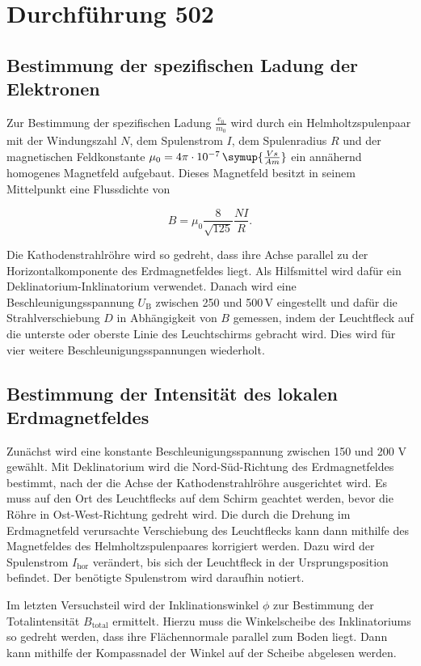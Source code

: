 \section{Durchführung 502}

\subsection{Bestimmung der spezifischen Ladung der Elektronen}

Zur Bestimmung der spezifischen Ladung $\frac{e_0}{m_0}$ wird durch ein Helmholtzspulenpaar mit der Windungszahl $N$, dem Spulenstrom $I$, dem Spulenradius $R$ und der magnetischen Feldkonstante 
$\mu_0 = 4\pi \cdot 10^{-7}\,\symup{\frac{V s}{A m}}$ ein annähernd homogenes Magnetfeld aufgebaut. Dieses Magnetfeld besitzt in seinem Mittelpunkt eine Flussdichte von

\begin{equation}
B = \mu_0 \frac{8}{\sqrt{125}} \frac{N I}{R}.
\end{equation}

Die Kathodenstrahlröhre wird so gedreht, dass ihre Achse parallel zu der Horizontalkomponente des Erdmagnetfeldes liegt. Als Hilfsmittel wird dafür ein Deklinatorium-Inklinatorium verwendet. Danach wird eine
Beschleunigungsspannung $U_{\text{B}}$ zwischen 250 und 500\,V eingestellt und dafür die Strahlverschiebung $D$ in Abhängigkeit von $B$ gemessen, indem der Leuchtfleck auf die unterste oder oberste Linie 
des Leuchtschirms gebracht wird. Dies wird für vier weitere Beschleunigungsspannungen wiederholt.



\subsection{Bestimmung der Intensität des lokalen Erdmagnetfeldes}

Zunächst wird eine konstante Beschleunigungsspannung zwischen 150 und 200 V gewählt. Mit Deklinatorium wird die Nord-Süd-Richtung des Erdmagnetfeldes bestimmt, nach der die Achse der Kathodenstrahlröhre 
ausgerichtet wird. Es muss auf den Ort des Leuchtflecks auf dem Schirm geachtet werden, bevor die Röhre in Ost-West-Richtung gedreht wird. Die durch die Drehung im Erdmagnetfeld verursachte Verschiebung des 
Leuchtflecks kann dann mithilfe des Magnetfeldes des Helmholtzspulenpaares korrigiert werden. Dazu wird der Spulenstrom $I_{\text{hor}}$ verändert, bis sich der Leuchtfleck in der Ursprungsposition befindet. 
Der benötigte Spulenstrom wird daraufhin notiert.

Im letzten Versuchsteil wird der Inklinationswinkel $\phi$ zur Bestimmung der Totalintensität $B_{\text{total}}$ ermittelt. Hierzu muss die Winkelscheibe des Inklinatoriums so gedreht werden, dass ihre Flächennormale
parallel zum Boden liegt. Dann kann mithilfe der Kompassnadel der Winkel auf der Scheibe abgelesen werden.